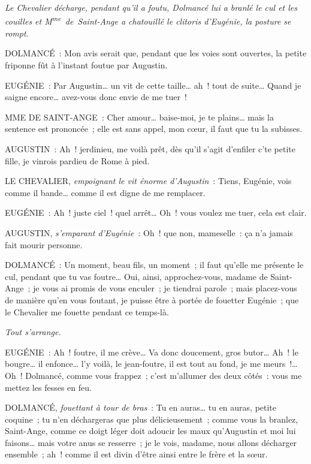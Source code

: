\documentclass[french,twoside]{book} %
\begin{document}
{\itshape Le Chevalier décharge, pendant qu’il a foutu, Dolmancé lui a branlé le cul et les couilles et M\textsuperscript{me} de Saint-Ange a chatouillé le clitoris d’Eugénie, la posture se rompt. }\par
DOLMANCÉ : Mon avis serait que, pendant que les voies sont ouvertes, la petite friponne fût à l’instant foutue par Augustin.\par
EUGÉNIE : Par Augustin… un vit de cette taille… ah ! tout de suite… Quand je saigne encore… avez-vous donc envie de me tuer !\par
MME DE SAINT-ANGE : Cher amour… baise-moi, je te plains… mais la sentence est prononcée ; elle est sans appel, mon cœur, il faut que tu la subisses.\par
AUGUSTIN : Ah ! jerdinieu, me voilà prêt, dès qu’il s’agit d’enfiler c’te petite fille, je vinrois pardieu de Rome à pied.\par
LE CHEVALIER, {\itshape empoignant le vit énorme d’Augustin} : Tiens, Eugénie, vois comme il bande… comme il est digne de me remplacer.\par
EUGÉNIE : Ah ! juste ciel ! quel arrêt… Oh ! vous voulez me tuer, cela est clair.\par
AUGUSTIN, {\itshape s’emparant d’Eugénie} : Oh ! que non, mameselle : ça n’a jamais fait mourir personne.\par
DOLMANCÉ : Un moment, beau fils, un moment ; il faut qu’elle me présente le cul, pendant que tu vas foutre… Oui, ainsi, approchez-vous, madame de Saint-Ange ; je vous ai promis de vous enculer ; je tiendrai parole ; mais placez-vous de manière qu’en vous foutant, je puisse être à portée de fouetter Eugénie ; que le Chevalier me fouette pendant ce temps-là.\par
{\itshape Tout s’arrange.}\par
EUGÉNIE : Ah ! foutre, il me crève… Va donc doucement, gros butor… Ah ! le bougre… il enfonce… l’y voilà, le jean-foutre, il est tout au fond, je me meurs !… Oh ! Dolmancé, comme vous frappez ; c’est m’allumer des deux côtés : vous me mettez les fesses en feu.\par
DOLMANCÉ, {\itshape fouettant à tour de bras} : Tu en auras… tu en auras, petite coquine ; tu n’en déchargeras que plus délicieusement ; comme vous la branlez, Saint-Ange, comme ce doigt léger doit adoucir les maux qu’Augustin et moi lui faisons… mais votre anus se resserre ; je le vois, madame, nous allons décharger ensemble ; ah ! comme il est divin d’être ainsi entre le frère et la sœur.\par
\end{document}
